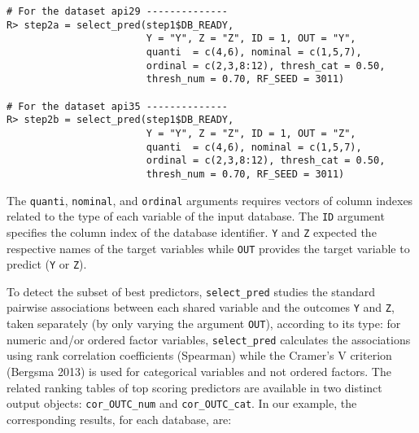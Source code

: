 \begin{verbatim}
# For the dataset api29 --------------
R> step2a = select_pred(step1$DB_READY,
                        Y = "Y", Z = "Z", ID = 1, OUT = "Y",
                        quanti  = c(4,6), nominal = c(1,5,7), 
                        ordinal = c(2,3,8:12), thresh_cat = 0.50, 
                        thresh_num = 0.70, RF_SEED = 3011)

# For the dataset api35 --------------
R> step2b = select_pred(step1$DB_READY,
                        Y = "Y", Z = "Z", ID = 1, OUT = "Z",
                        quanti  = c(4,6), nominal = c(1,5,7), 
                        ordinal = c(2,3,8:12), thresh_cat = 0.50, 
                        thresh_num = 0.70, RF_SEED = 3011)
\end{verbatim}

The \texttt{quanti}, \texttt{nominal}, and \texttt{ordinal} arguments requires vectors of column indexes related to the type
of each variable of the input database. The \texttt{ID} argument specifies the column index of the database identifier. \texttt{Y} and \texttt{Z} expected the respective names of the target variables while \texttt{OUT} provides the target variable to predict (\texttt{Y} or \texttt{Z}).

To detect the subset of best predictors, \texttt{select\_pred} studies the standard pairwise associations between
each shared variable and the outcomes \texttt{Y} and \texttt{Z}, taken separately (by only varying the argument \texttt{OUT}), according to its type: for numeric and/or ordered factor variables, \texttt{select\_pred} calculates the associations using rank correlation coefficients (Spearman) while the Cramer's V criterion (Bergsma 2013) is used for categorical variables and not ordered factors. The related ranking tables of top scoring predictors are available in two distinct output objects: \texttt{cor\_OUTC\_num} and \texttt{cor\_OUTC\_cat}. In our example, the corresponding results, for each database, are:

